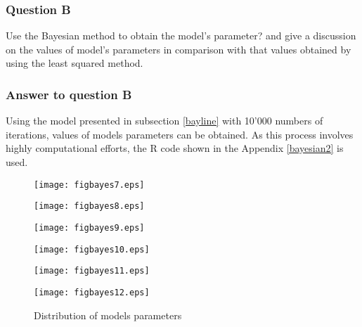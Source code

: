 \subsubsection{Question B}
Use the Bayesian method to obtain the model's parameter? and give a discussion on the values of model's parameters in comparison with that values obtained by using the least squared method.
\subsubsection{Answer to question B}
Using the model presented in subsection \ref{bayline} with 10'000 numbers of iterations, values of models parameters can be obtained. As this process involves highly computational efforts, the R code shown in the Appendix \ref{bayesian2} is used. 

\begin{figure}[ht]
 \begin{minipage}[h]{0.5\linewidth}
        \centering
        \texttt{[image: figbayes7.eps]}
				\label{figbayes7}
     \end{minipage}
\vspace{3.00mm}
    \begin{minipage}[h]{0.5\linewidth}
       \centering
       \texttt{[image: figbayes8.eps]}
			\label{figbayes8}
     \end{minipage}
\vspace{3.00mm} 
    \begin{minipage}[h]{0.5\linewidth}
        \centering
        \texttt{[image: figbayes9.eps]}
				\label{figbayes9}
     \end{minipage}
\vspace{3.00mm}
    \begin{minipage}[h]{0.5\linewidth}
       \centering
       \texttt{[image: figbayes10.eps]}
			\label{figbayes10}
     \end{minipage}
     \vspace{3.00mm}
    \begin{minipage}[h]{0.5\linewidth}
       \centering
       \texttt{[image: figbayes11.eps]}
			\label{figbayes11}
     \end{minipage}
     \vspace{3.00mm}
    \begin{minipage}[h]{0.5\linewidth}
       \centering
       \texttt{[image: figbayes12.eps]}
			\label{figbayes12}
     \end{minipage}
\caption{Distribution of models parameters}
\label{figbayesxx}
\end{figure}

